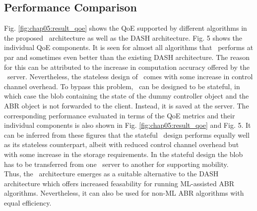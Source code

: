 \subsection{Performance Comparison}
Fig. \ref{fig:chap05:result_qoe} shows the QoE supported by different algorithms in the proposed \bel\ architecture as well as the \ac{DASH} architecture. Fig. 5 shows the individual QoE components. It is seen for almost all algorithms that \bel\  performs at par and sometimes even better than the existing DASH architecture. The reason for this can be attributed to the increase in computation accuracy offered by the \servname\ server. Nevertheless, the stateless design of \bel\ comes with some increase in control channel overhead. To bypass this problem, \bel\ can be designed to be stateful, in which case the blob containing the state of the dummy controller object and the ABR object is not forwarded to the client. Instead, it is saved at the server. The corresponding performance evaluated in terms of the \ac{QoE} metrics and their individual components is also shown in Fig. \ref{fig:chap05:result_qoe} and Fig. 5. It can be inferred from these figures that the stateful \bel\ design performs equally well as its stateless counterpart, albeit with reduced control channel overhead but with some increase in the storage requirements. In the stateful design the blob has to be transferred from one \servname\ server to another for supporting mobility.\\
\indent Thus, the \bel\ architecture emerges as a suitable alternative to the \ac{DASH} architecture which offers increased feasability for running ML-assisted \ac{ABR} algorithms. Nevertheless, it can also be used for non-ML \ac{ABR} algorithms with equal efficiency. 
